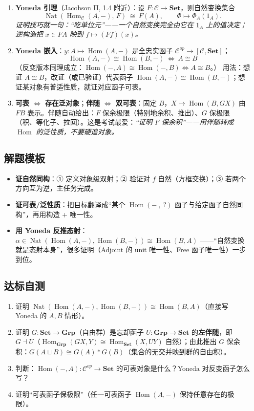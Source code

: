 \documentclass[12pt,a4paper]{ctexart}
\DeclareMathOperator{\Hom}{Hom}
\newcommand{\keypoint}{\text{\textbf{\ensuremath{\bigstar}}\;}}
\newcommand{\method}{\text{\textbf{方法}}\;}
\begin{document}
\begin{enumerate}
  \item \textbf{Yoneda 引理}（Jacobson II, 1.4 附近）：设 $F\colon\mathcal C\to\mathbf{Set}$，则自然变换集合
  \[
    \operatorname{Nat}(\Hom_{\mathcal C}(A,-),\,F)\ \cong\ F(A),
    \qquad \Phi\longmapsto \Phi_A(1_A).
  \]
  \textit{证明技巧就一句：\keypoint “吃单位元”——一个自然变换完全由它在 $1_A$ 上的值决定；逆构造把 $x\in FA$ 映到 $f\mapsto(Ff)(x)$。}
\item \textbf{Yoneda 嵌入}：$y\colon A\mapsto\Hom(A,-)$ 是全忠实函子 $\mathcal C^{op}\to[\mathcal C,\mathbf{Set}]$；
  \[
    \Hom(A,-)\cong\Hom(B,-)\ \Longleftrightarrow\ A\cong B
  \]
  （反变版本同理成立：$\Hom(-,A)\cong\Hom(-,B)\iff A\cong B$。）
  \keypoint 用法：想证 $A\cong B$，改证（或已验证）代表函子 $\Hom(A,-)\cong\Hom(B,-)$；想证某对象有普适性质，就证对应函子可表。
  \item \textbf{可表 $\iff$ 存在泛对象}；\textbf{伴随 $\iff$ 双可表}：固定 $B$，$X\mapsto\Hom(B,GX)$ 由 $FB$ 表示。\keypoint 伴随自动给出：$F$ 保余极限（特别地余积、推出）、$G$ 保极限（积、等化子、拉回）。这是考试最爱：\textit{“证明 $F$ 保余积”——用伴随转成 $\Hom$ 的泛性质，不要硬追对象。}
\end{enumerate}

\subsection{\method 解题模板}

\begin{itemize}
  \item \textbf{证自然同构}：① 定义对象级双射；② 验证对 $f$ 自然（方框交换）；③ 若两个方向互为逆，主任务完成。
  \item \textbf{证可表/泛性质}：把目标翻译成“某个 $\Hom(-\ ,\ ?)$ 函子与给定函子自然同构”，再用构造 + 唯一性。
  \item \textbf{用 Yoneda 反推态射}：$\alpha\in\operatorname{Nat}(\Hom(A,-),\Hom(B,-))\cong\Hom(B,A)$ ——“自然变换就是态射本身”，很多证明（Adjoint 的 unit 唯一性、Free 函子唯一性）一步到位。
\end{itemize}

\subsection{达标自测}
\begin{enumerate}[label=(\arabic*)]
  \item 证明 $\operatorname{Nat}(\Hom(A,-),\Hom(B,-))\cong\Hom(B,A)$（直接写 Yoneda 的 $A,B$ 情形）。
  \item 证明 $G\colon\mathbf{Set}\to\mathbf{Grp}$（自由群）是忘却函子 $U\colon\mathbf{Grp}\to\mathbf{Set}$ 的\textbf{左伴随}，即 $G\dashv U$（$\Hom_{\mathbf{Grp}}(GX,Y)\cong\Hom_{\mathbf{Set}}(X,UY)$ 自然）；由此推出 $G$ 保余积：$G(A\sqcup B)\cong G(A)*G(B)$（集合的无交并映到群的自由积）。
  \item 判断：$\Hom(-,A)\colon\mathcal C^{op}\to\mathbf{Set}$ 的可表对象是什么？Yoneda 对反变函子怎么写？
  \item 证明“可表函子保极限”（任一可表函子 $\Hom(A,-)$ 保持任意存在的极限）。
\end{enumerate}
\end{document}
